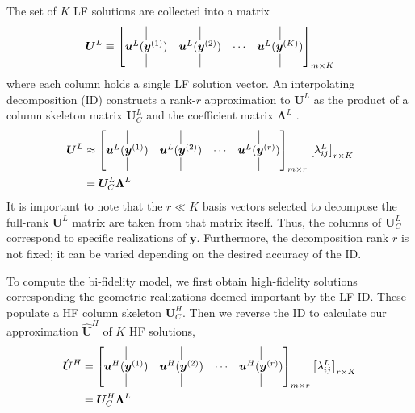 \documentclass[11pt]{article}
\begin{document}
The set of $K$ LF solutions are collected into a matrix
\begin{equation}
\bm{U}^L
\equiv
\begin{bmatrix}
\vline & \vline & & \vline \\
\bm{u}^L(\bm{y}^{(1)}) & \bm{u}^L(\bm{y}^{(2)}) & \cdots & \bm{u}^L(\bm{y}^{(K)}) \\
\vline & \vline & & \vline
\end{bmatrix}_{m \times K}
\end{equation}
where each column holds a single LF solution vector. An interpolating decomposition (ID) constructs a rank-$r$ approximation to $\bm{U}^L$ as the product of a column skeleton matrix $\bm{U}^L_C$ and the coefficient matrix $\bm{\Lambda}^L$ \citep{doostan2016}.
\begin{equation}
\begin{aligned}
\bm{U}^L
&\approx
\begin{bmatrix}
\vline & \vline & & \vline \\
\bm{u}^L(\bm{y}^{(1)}) & \bm{u}^L(\bm{y}^{(2)}) & \cdots & \bm{u}^L(\bm{y}^{(r)}) \\
\vline & \vline & & \vline
\end{bmatrix}_{m \times r}
\begin{bmatrix}
\lambda^L_{ij}
\end{bmatrix}_{r \times K}
\\
&= \bm{U}^L_C \bm{\Lambda}^L
\end{aligned}
\end{equation}
It is important to note that the $r \ll K$ basis vectors selected to decompose the full-rank $\bm{U}^L$ matrix are taken from that matrix itself. Thus, the columns of $\bm{U}^L_C$ correspond to specific realizations of $\bm{y}$. Furthermore, the decomposition rank $r$ is not fixed; it can be varied depending on the desired accuracy of the ID.

To compute the bi-fidelity model, we first obtain high-fidelity solutions corresponding the geometric realizations deemed important by the LF ID. These populate a HF column skeleton $\bm{U}^H_C$. Then we reverse the ID to calculate our approximation $\hat{\bm{U}}^H$ of $K$ HF solutions,
\begin{equation}
\begin{aligned}
\hat{\bm{U}}^H
&=
\begin{bmatrix}
\vline & \vline & & \vline \\
\bm{u}^H(\bm{y}^{(1)}) & \bm{u}^H(\bm{y}^{(2)}) & \cdots & \bm{u}^H(\bm{y}^{(r)}) \\
\vline & \vline & & \vline
\end{bmatrix}_{m \times r}
\begin{bmatrix}
\lambda^L_{ij}
\end{bmatrix}_{r \times K}
\\
&= \bm{U}^H_C \bm{\Lambda}^L
\end{aligned}
\end{equation}
\end{document}
